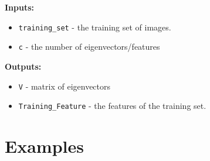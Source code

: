 \documentclass[10pt]{article}
\begin{document}
{\bf Inputs:} 
\begin{itemize}
\item {\tt training\_set} - the training set of images.
\item {\tt c} - the number of eigenvectors/features
\end{itemize}

{\bf Outputs:}
\begin{itemize}
\item {\tt V} - matrix of eigenvectors 
\item {\tt Training\_Feature} - the features of the training set. 
\end{itemize}


\section{Examples}
\end{document}
